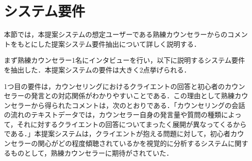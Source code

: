 \documentclass[shuuron]{kuee}
\begin{document}
%
%





\section{システム要件}

本節では，本提案システムの想定ユーザーである熟練カウンセラーからのコメントをもとにした提案システム要件抽出について詳しく説明する．


まず熟練カウンセラー1名にインタビューを行い，以下に説明するシステム要件を抽出した．本提案システムの要件は大きく2点挙げられる．


1つ目の要件は，カウンセリングにおけるクライエントの回答と初心者のカウンセラーの発言との対応関係がわかりやすいことである．この理由として熟練カウンセラーから得られたコメントは，次のとおりである．「カウンセリングの会話の流れのテキストデータでは，カウンセラー自身の発言量や質問の種類によって，それに対するクライエントの回答についてまったく展開が異なってくるからである．」本提案システムは，クライエントが抱える問題に対して，初心者カウンセラーの関心がどの程度傾聴されているかを視覚的に分析するシステムに関するものとして，熟練カウンセラーに期待がされていた．
\end{document}
